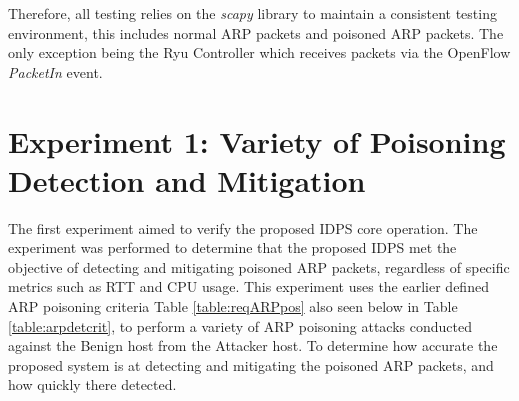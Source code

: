 \documentclass[12pt, oneside]{book}
\begin{document}
Therefore, all testing relies on the \emph{scapy} library to maintain a consistent testing environment, this includes normal
ARP packets and poisoned ARP packets. The only exception being the Ryu Controller which receives packets via the
OpenFlow \emph{PacketIn} event.

\newpage
\section{Experiment 1: Variety of Poisoning Detection and Mitigation}
\begin{minipage}{0.48\textwidth}
		
	The first experiment aimed to verify the proposed IDPS core operation. The experiment
	was performed to determine that the proposed IDPS met the objective of detecting and mitigating poisoned ARP packets, regardless of specific
	metrics such as RTT and CPU usage.
	This experiment uses the earlier defined ARP poisoning criteria Table \ref{table:reqARPpos} also seen below in
	Table \ref{table:arpdetcrit}, to perform a variety of ARP poisoning attacks conducted against the Benign host from the Attacker host.
	To determine how accurate the proposed system is at detecting and mitigating the poisoned ARP packets, and 
	how quickly there detected.
	

\end{minipage} \hfill
\end{document}
